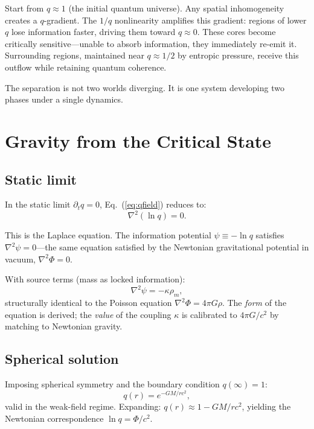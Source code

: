 \documentclass[reprint]{revtex4-2}
\begin{document}
Start from $q\approx 1$ (the initial quantum universe). Any spatial inhomogeneity creates a $q$-gradient. The $1/q$ nonlinearity amplifies this gradient: regions of lower $q$ lose information faster, driving them toward $q\approx 0$. These cores become critically sensitive---unable to absorb information, they immediately re-emit it. Surrounding regions, maintained near $q\approx 1/2$ by entropic pressure, receive this outflow while retaining quantum coherence.

The separation is not two worlds diverging. It is one system developing two phases under a single dynamics.

\section{Gravity from the Critical State}

\subsection{Static limit}

In the static limit $\partial_t q=0$, Eq.~(\ref{eq:qfield}) reduces to:
\begin{equation}
\boxed{\nabla^2(\ln q) = 0}.
\label{eq:laplace}
\end{equation}

This is the Laplace equation. The information potential $\psi\equiv -\ln q$ satisfies $\nabla^2\psi=0$---the same equation satisfied by the Newtonian gravitational potential in vacuum, $\nabla^2\Phi=0$.

With source terms (mass as locked information):
\begin{equation}
\nabla^2\psi = -\kappa\rho_m,
\end{equation}
structurally identical to the Poisson equation $\nabla^2\Phi = 4\pi G\rho$. The \emph{form} of the equation is derived; the \emph{value} of the coupling $\kappa$ is calibrated to $4\pi G/c^2$ by matching to Newtonian gravity.

\subsection{Spherical solution}

Imposing spherical symmetry and the boundary condition $q(\infty)=1$:
\begin{equation}
\boxed{q(r) = e^{-GM/rc^2}},
\label{eq:spherical}
\end{equation}
valid in the weak-field regime. Expanding: $q(r)\approx 1 - GM/rc^2$, yielding the Newtonian correspondence $\ln q = \Phi/c^2$.
\end{document}
